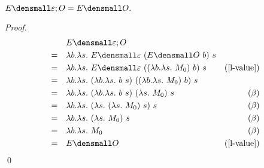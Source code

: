 \begin{lemma}
  \label{thm:ext-compose-id-left}
    $ E\den{\varepsilon; O} = E\den{O}.$
\end{lemma}
    \begin{proof}
        \begin{align*}
            &\quad E\den{\varepsilon; O} \\
            =& \quad \lambda b. \lambda s.~ E\den{\varepsilon} ~(E\den{O} ~b) ~s \\
            =&  \quad \lambda b. \lambda s.~ E\den{\varepsilon} ~((\lambda b. \lambda s.~ M_0) ~b) ~s & (\cref{l-value})\\
            =& \quad \lambda b. \lambda s.~ (\lambda b. \lambda s.~ b ~s) ~((\lambda b. \lambda s.~ M_0) ~b) ~s \\
            =& \quad \lambda b. \lambda s.~ (\lambda b. \lambda s.~ b ~s) ~(\lambda s.~ M_0) ~s & (\beta)\\
            =& \quad \lambda b. \lambda s.~ (\lambda s.~ (\lambda s.~ M_0) ~s) ~s & (\beta)\\
            =& \quad \lambda b. \lambda s.~ (\lambda s.~ M_0) ~s & (\beta)\\
            =& \quad \lambda b. \lambda s.~ M_0 & (\beta) \\
            =& \quad E\den{O} & (\cref{l-value})
        \end{align*}
        \qed
    \end{proof}

    

